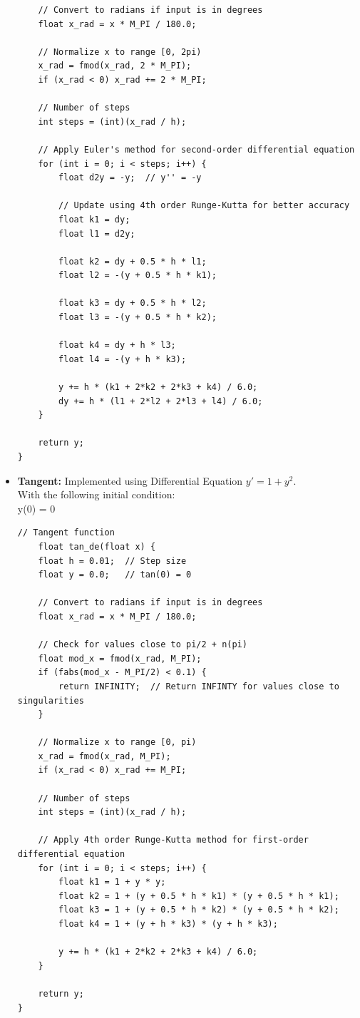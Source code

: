 \documentclass[12pt]{article}
\begin{document}
\begin{itemize}
\begin{lstlisting}
    // Convert to radians if input is in degrees
    float x_rad = x * M_PI / 180.0;
    
    // Normalize x to range [0, 2pi)
    x_rad = fmod(x_rad, 2 * M_PI);
    if (x_rad < 0) x_rad += 2 * M_PI;
    
    // Number of steps
    int steps = (int)(x_rad / h);
    
    // Apply Euler's method for second-order differential equation
    for (int i = 0; i < steps; i++) {
        float d2y = -y;  // y'' = -y
        
        // Update using 4th order Runge-Kutta for better accuracy
        float k1 = dy;
        float l1 = d2y;
        
        float k2 = dy + 0.5 * h * l1;
        float l2 = -(y + 0.5 * h * k1);
        
        float k3 = dy + 0.5 * h * l2;
        float l3 = -(y + 0.5 * h * k2);
        
        float k4 = dy + h * l3;
        float l4 = -(y + h * k3);
        
        y += h * (k1 + 2*k2 + 2*k3 + k4) / 6.0;
        dy += h * (l1 + 2*l2 + 2*l3 + l4) / 6.0;
    }
    
    return y;
}
    \end{lstlisting}

    \item \textbf{Tangent:} Implemented using Differential Equation $y' = 1 + y^2$.\\
    With the following initial condition:\\
    y(0) = 0

    \begin{lstlisting}[caption={Tangent function implementation using Differential Equation}]
    // Tangent function
    float tan_de(float x) {
    float h = 0.01;  // Step size
    float y = 0.0;   // tan(0) = 0
    
    // Convert to radians if input is in degrees
    float x_rad = x * M_PI / 180.0;
    
    // Check for values close to pi/2 + n(pi)
    float mod_x = fmod(x_rad, M_PI);
    if (fabs(mod_x - M_PI/2) < 0.1) {
        return INFINITY;  // Return INFINTY for values close to singularities
    }
    
    // Normalize x to range [0, pi)
    x_rad = fmod(x_rad, M_PI);
    if (x_rad < 0) x_rad += M_PI;
    
    // Number of steps
    int steps = (int)(x_rad / h);
    
    // Apply 4th order Runge-Kutta method for first-order differential equation
    for (int i = 0; i < steps; i++) {
        float k1 = 1 + y * y;
        float k2 = 1 + (y + 0.5 * h * k1) * (y + 0.5 * h * k1);
        float k3 = 1 + (y + 0.5 * h * k2) * (y + 0.5 * h * k2);
        float k4 = 1 + (y + h * k3) * (y + h * k3);
        
        y += h * (k1 + 2*k2 + 2*k3 + k4) / 6.0;
    }
    
    return y;
}
\end{lstlisting}

\end{itemize}
\end{document}
